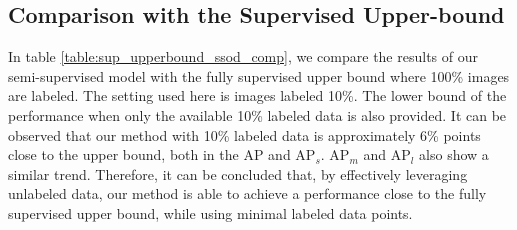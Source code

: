 \begin{table}
    \caption{Results comparison of inference with predicted crops vs crops obtained by algorithm \ref{alg:crop_discovery} on detection boxes. The Visdrone dataset with 10\% labels is used in the study.}
    \centering
    \label{table:inf_comparison}
\end{table}

\subsection{Comparison with the Supervised Upper-bound}
In table \ref{table:sup_upperbound_ssod_comp}, we compare the results of our semi-supervised model with the fully supervised upper bound where 100\% images are labeled. The setting used here is images labeled 10\%. The lower bound of the performance when only the available 10\% labeled data is also provided. It can be observed that our method with 10\% labeled data is approximately 6\% points close to the upper bound, both in the AP and $\textrm{AP}_{s}$. $\textrm{AP}_{m}$ and $\textrm{AP}_{l}$ also show a similar trend. Therefore, it can be concluded that, by effectively leveraging unlabeled data, our method is able to achieve a performance close to the fully supervised upper bound, while using minimal labeled data points.

